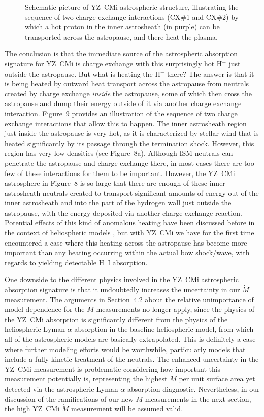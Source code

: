 \documentclass[preprint]{aastex}
\begin{document}
\begin{figure}[t]
\caption{Schematic picture of YZ~CMi astrospheric structure, illustrating the
  sequence of two charge exchange interactions (CX\#1 and CX\#2) by which
  a hot proton in the inner astrosheath (in purple)
  can be transported across the astropause, and there heat the plasma.}
\end{figure}
     The conclusion is that the immediate source of the astrospheric
absorption signature for YZ~CMi is charge exchange with
this surprisingly hot H$^+$ just outside
the astropause.  But what is heating the H$^+$ there?  The answer is that
it is being heated by outward heat transport across the astropause from
neutrals created by charge exchange {\em inside} the astropause, some of
which then cross the astropause and dump their energy outside of it via
another charge exchange interaction.  Figure~9 provides an illustration of
the sequence of two charge exchange interactions that allow this to
happen.  The inner astrosheath region just
inside the astropause is very hot, as it is characterized by stellar wind
that is heated significantly by its passage through the termination shock.
However, this region has very low densities (see Figure~8a).  Although ISM
neutrals can penetrate the astropause and charge exchange there, in most
cases there are too few of these interactions for them to be important.
However, the YZ~CMi astrosphere in Figure~8 is so large that there are
enough of these inner astrosheath neutrals created to transport significant
amounts of energy out of the inner astrosheath and into the part of the
hydrogen wall just outside the astropause, with the energy deposited via
another charge exchange reaction.  Potential effects of this kind
of anomalous heating have been discussed before in the context of
heliospheric models \citep[e.g.,][]{gpz13}, but with YZ~CMi we have for the
first time encountered a case where this heating across the astropause has
become more important than any heating occurring within the actual
bow shock/wave, with regards to yielding detectable H~I absorption.

     One downside to the different physics involved in the YZ~CMi astrospheric
absorption signature is that it undoubtedly increases the uncertainty in
our $\dot{M}$ measurement.  The arguments in Section~4.2 about the
relative unimportance of model dependence for the $\dot{M}$ measurements
no longer apply, since the physics of the YZ~CMi absorption is
significantly different from the physics of the heliospheric Lyman-$\alpha$
absorption in the baseline heliospheric model, from which all of the
astrospheric models are basically extrapolated.  This is definitely
a case where further modeling efforts would be worthwhile, particularly
models that include a fully kinetic treatment of the neutrals.  The
enhanced uncertainty in the YZ~CMi measurement is problematic
considering how important this measurement potentially is, representing
the highest $\dot{M}$ per unit surface area yet detected via the
astrospheric Lyman-$\alpha$ absorption diagnostic.  Nevertheless,
in our discussion of the ramifications of our new $\dot{M}$ measurements
in the next section, the high YZ~CMi $\dot{M}$ measurement will be
assumed valid.
\end{document}
